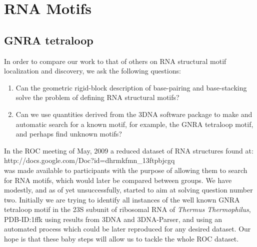 \chapter{RNA Motifs}
\label{motifs} 


\section{GNRA tetraloop}
In order to compare our work to that of others on RNA structural motif
localization and discovery, we ask the following questions:
\begin{enumerate}
\item{Can  the geometric rigid-block  description of  base-pairing and
  base-stacking solve the problem of defining RNA structural motifs?}
\item{Can we use quantities derived  from the 3DNA software package to
  make and automatic  search for a known motif,  for example, the GNRA
  tetraloop motif, and perhaps find unknown motifs?}
\end{enumerate}
In the  ROC meeting of May,  2009 a reduced dataset  of RNA structures
found  at:\\  http://docs.google.com/Doc?id=dhrmkfmn\_13ftpbjcgq\\ was
made available  to participants with  the purpose of allowing  them to
search for RNA motifs, which would later be compared between groups.
We  have modestly, and  as of  yet unsuccessfully,  started to  aim at
solving question number  two. Initially we are trying  to identify all
instances of the well known GNRA tetraloop motif in the 23S subunit of
ribosomal  RNA  of  \textit{Thermus Thermophilus},  PDB-ID:1ffk  using
results  from 3DNA  and 3DNA-Parser,  and using  an  automated process
which could be later reproduced  for any desired dataset.  Our hope is
that  these baby  steps  will allow  us to  tackle  the whole  ROC
dataset.

